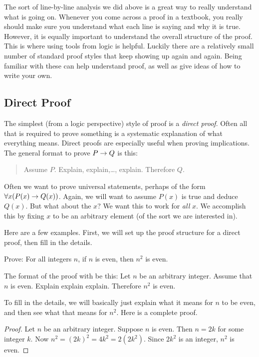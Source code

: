 \documentclass[12pt]{article}
\begin{document}
 

 
 The sort of line-by-line analysis we did above is a great way to really understand what is going on.  Whenever you come across a proof in a textbook, you really should make sure you understand what each line is saying and why it is true.  However, it is equally important to understand the overall structure of the proof.  This is where using tools from logic is helpful.  Luckily there are a relatively small number of standard proof styles that keep showing up again and again.  Being familiar with these can help understand proof, as well as give ideas of how to write your own.
 
 \subsection*{Direct Proof}
 
 The simplest (from a logic perspective) style of proof is a {\em direct proof}.  Often all that is required to prove something is a systematic explanation of what everything means.  Direct proofs are especially useful when proving implications.  The general format to prove $P \rightarrow Q$ is this:
 
 \begin{quote}
 Assume $P$.  Explain, explain,\ldots, explain.  Therefore $Q$.
 \end{quote}
 
 Often we want to prove universal statements, perhaps of the form $\forall x (P(x) \rightarrow Q(x))$.  Again, we will want to assume $P(x)$ is true and deduce $Q(x)$.  But what about the $x$?  We want this to work for {\em all} $x$.  We accomplish this by fixing $x$ to be an arbitrary element (of the sort we are interested in).  
 
 Here are a few examples.  First, we will set up the proof structure for a direct proof, then fill in the details.
 
 \begin{example}
 	Prove: For all integers $n$, if $n$ is even, then $n^2$ is even.
 	
 	\begin{solution}
	 	The format of the proof with be this: Let $n$ be an arbitrary integer.  Assume that $n$ is even.  Explain explain explain.  Therefore $n^2$ is even.
	 	
	 	To fill in the details, we will basically just explain what it means for $n$ to be even, and then see what that means for $n^2$.  Here is a complete proof.

 	   \begin{proof}
 	     Let $n$ be an arbitrary integer.  Suppose $n$ is even.  Then $n = 2k$ for some integer $k$.  Now $n^2 = (2k)^2 = 4k^2 = 2(2k^2)$.  Since $2k^2$ is an integer, $n^2$ is even.
 	   \end{proof}
 	\end{solution}
 \end{example}
 
\end{document}
